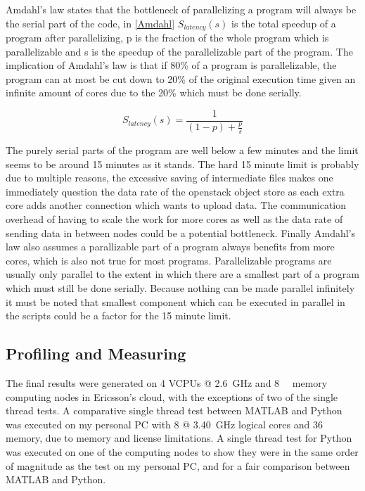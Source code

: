 \documentclass[12pt, a4paper]{article}
\begin{document}
Amdahl's law states that the bottleneck of parallelizing a program will always be the serial part of the code, in \cref{Amdahl} $S_{latency}(s)$ is the total speedup of a program after parallelizing, p is the fraction of the whole program which is parallelizable and s is the speedup of the parallelizable part of the program.
The implication of Amdahl's law is that if 80\% of a program is parallelizable, the program can at most be cut down to 20\% of the original execution time given an infinite amount of cores due to the 20\% which must be done serially.

\begin{equation}\label{Amdahl}
    S_{latency}(s) = \frac{1}{(1-p) + \frac{p}{s}}
\end{equation}

The purely serial parts of the program are well below a few minutes and the limit seems to be around 15 minutes as it stands.
The hard 15 minute limit is probably due to multiple reasons, the excessive saving of intermediate files makes one immediately question the data rate of the openstack object store as each extra core adds another connection which wants to upload data. 
The communication overhead of having to scale the work for more cores as well as the data rate of sending data in between nodes could be a potential bottleneck.
Finally Amdahl's law also assumes a parallizable part of a program always benefits from more cores, which is also not true for most programs.
Parallelizable programs are usually only parallel to the extent in which there are a smallest part of a program which must still be done serially.
Because nothing can be made parallel infinitely it must be noted that smallest component which can be executed in parallel in the scripts could be a factor for the 15 minute limit.


\subsection{Profiling and Measuring}

The final results were generated on 4 VCPUs @ \SI{2.6}{\giga\hertz} and \SI{8}{\giga\byte} memory computing nodes in Ericsson's cloud, with the exceptions of two of the single thread tests.
A comparative single thread test between MATLAB and Python was executed on my personal PC with 8 @ \SI{3.40}{\giga\hertz} logical cores and \SI{36}{\giga\byte} memory, due to memory and license limitations. 
A single thread test for Python was executed on one of the computing nodes to show they were in the same order of magnitude as the test on my personal PC, and for a fair comparison between MATLAB and Python.
\end{document}
